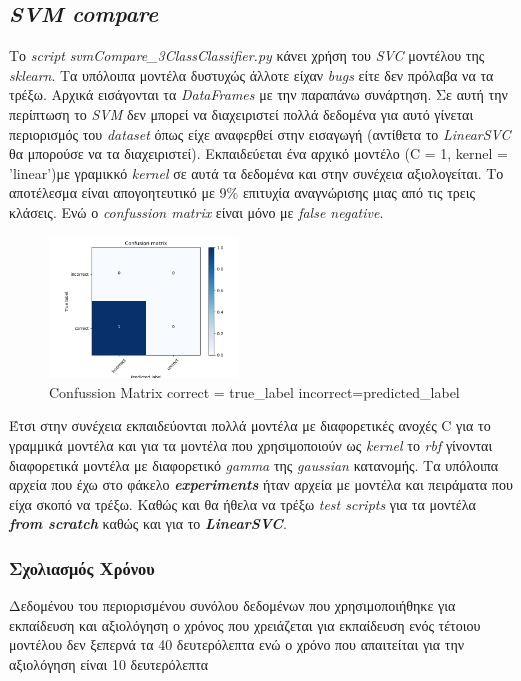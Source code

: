 \documentclass[10pt,a4paper,]{article}
\begin{document}
\subsection{\textit{SVM compare}}
Το \textit{script} \textit{svmCompare\_3ClassClassifier.py} κάνει χρήση του \textit{SVC} μοντέλου της \textit{sklearn}. Τα υπόλοιπα μοντέλα δυστυχώς άλλοτε είχαν \textit{bugs} είτε δεν πρόλαβα να τα τρέξω.
Αρχικά εισάγονται τα \textit{DataFrames} με την παραπάνω συνάρτηση. Σε αυτή την περίπτωση το \textit{SVM} δεν μπορεί να διαχειριστεί πολλά δεδομένα για αυτό γίνεται περιορισμός του \textit{dataset} όπως είχε αναφερθεί στην εισαγωγή (αντίθετα το \textit{LinearSVC} θα μπορούσε να τα διαχειριστεί). Εκπαιδεύεται ένα αρχικό μοντέλο (C = 1, kernel = 'linear')με γραμικκό \textit{kernel} 
σε αυτά τα δεδομένα και στην συνέχεια αξιολογείται. Το αποτέλεσμα είναι απογοητευτικό με 9\% επιτυχία αναγνώρισης μιας από τις τρεις κλάσεις. Ενώ ο \textit{confussion matrix} είναι μόνο με \textit{false negative}.
\begin{figure}[!htb]
    \centering
    \includegraphics[width=5cm]{img/CM.png}
    \caption{Confussion Matrix correct = true\_label incorrect=predicted\_label}
    \label{fig:my_label}
\end{figure}
Έτσι στην συνέχεια εκπαιδεύονται πολλά μοντέλα με διαφορετικές ανοχές C για το γραμμικά μοντέλα και για τα μοντέλα που χρησιμοποιούν ως \textit{kernel} το \textit{rbf} γίνονται διαφορετικά μοντέλα με διαφορετικό \textit{gamma} της \textit{gaussian} κατανομής. 
Tα υπόλοιπα αρχεία που έχω στο φάκελο \textbf{\textit{experiments}} ήταν αρχεία με μοντέλα και πειράματα που είχα σκοπό να τρέξω. Καθώς και θα ήθελα να τρέξω \textit{test scripts} για τα μοντέλα \textbf{\textit{from scratch}} καθώς και για το \textbf{\textit{LinearSVC}}.
\subsubsection{Σχολιασμός Χρόνου}
Δεδομένου του περιορισμένου συνόλου δεδομένων που χρησιμοποιήθηκε για εκπαίδευση και αξιολόγηση ο χρόνος που χρειάζεται για εκπαίδευση ενός τέτοιου μοντέλου δεν ξεπερνά τα 40 δευτερόλεπτα ενώ ο χρόνο που απαιτείται για την αξιολόγηση είναι 10 δευτερόλεπτα
\end{document}
